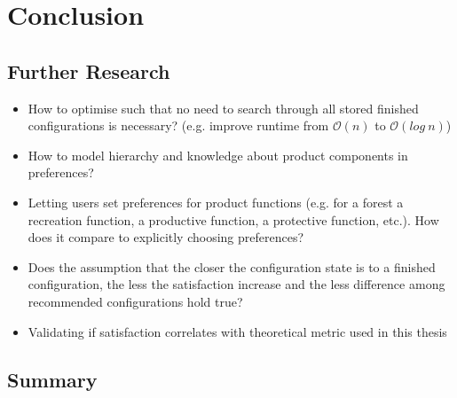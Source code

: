 \chapter{Conclusion}
\label{ch:Conclusion}

\section{Further Research}
\label{sec:Conclusion:PossibleExtensions}

\begin{itemize}
    \item How to optimise such that no need to search through all stored finished configurations is necessary? (e.g. improve runtime from $\mathcal{O}(n)$ to $\mathcal{O}(log\ n)$)
    \item How to model hierarchy and knowledge about product components in preferences?
    \item Letting users set preferences for product functions (e.g. for a forest a recreation function, a productive function, a protective function, etc.). How does it compare to explicitly choosing preferences?
    \item Does the assumption that the closer the configuration state is to a finished configuration, the less the satisfaction increase and the less difference among recommended configurations hold true?
    \item Validating if satisfaction correlates with theoretical metric used in this thesis
\end{itemize}

\section{Summary}
\label{sec:Conclusion:Summary}